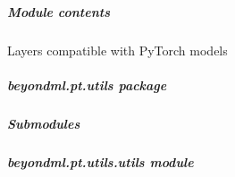 \documentclass[letterpaper,10pt,english]{sphinxmanual}
\begin{document}
\subparagraph{Module contents}
\label{\detokenize{beyondml.pt.layers:module-beyondml.pt.layers}}\label{\detokenize{beyondml.pt.layers:module-contents}}
\sphinxAtStartPar
Layers compatible with PyTorch models

\sphinxstepscope


\subparagraph{beyondml.pt.utils package}
\label{\detokenize{beyondml.pt.utils:beyondml-pt-utils-package}}\label{\detokenize{beyondml.pt.utils::doc}}

\subparagraph{Submodules}
\label{\detokenize{beyondml.pt.utils:submodules}}

\subparagraph{beyondml.pt.utils.utils module}
\label{\detokenize{beyondml.pt.utils:module-beyondml.pt.utils.utils}}\label{\detokenize{beyondml.pt.utils:beyondml-pt-utils-utils-module}}
\end{document}
